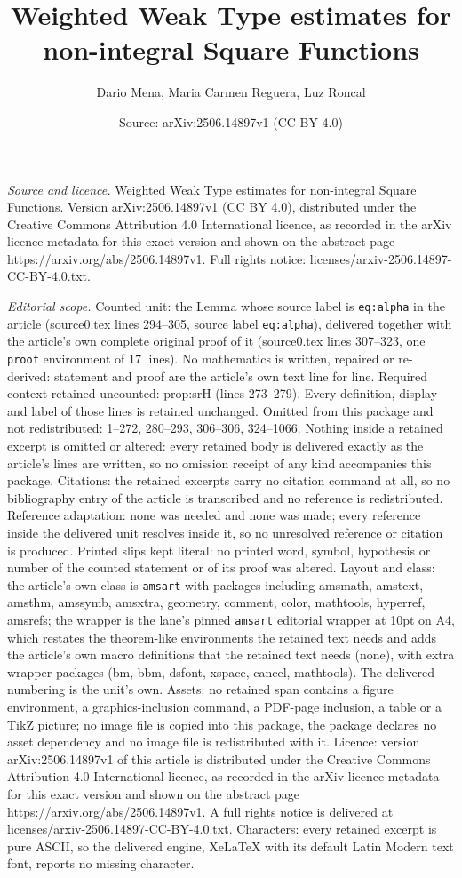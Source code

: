 \documentclass[10pt,a4paper]{amsart}
\title[Weighted Weak Type estimates for non-integral Square Functio]{Weighted Weak Type estimates for non-integral Square Functions}
\author{Dario Mena, Maria Carmen Reguera, Luz Roncal}
\date{Source: arXiv:2506.14897v1 (CC BY 4.0)}
\begin{document}
\maketitle

\noindent\emph{Source and licence.} Weighted Weak Type estimates for non-integral Square Functions. Version arXiv:2506.14897v1 (CC BY 4.0), distributed under the Creative Commons Attribution 4.0 International licence, as recorded in the arXiv licence metadata for this exact version and shown on the abstract page https://arxiv.org/abs/2506.14897v1. Full rights notice: licenses/arxiv-2506.14897-CC-BY-4.0.txt.\par\smallskip

\noindent\textit{Editorial scope.} Counted unit: the Lemma whose source label is \texttt{eq:alpha} in the article (source0.tex lines 294--305, source label \texttt{eq:alpha}), delivered together with the article's own complete original proof of it (source0.tex lines 307--323, one \texttt{proof} environment of 17 lines). No mathematics is written, repaired or re-derived: statement and proof are the article's own text line for line. Required context retained uncounted: prop:srH (lines 273--279). Every definition, display and label of those lines is retained unchanged. Omitted from this package and not redistributed: 1--272, 280--293, 306--306, 324--1066. Nothing inside a retained excerpt is omitted or altered: every retained body is delivered exactly as the article's lines are written, so no omission receipt of any kind accompanies this package. Citations: the retained excerpts carry no citation command at all, so no bibliography entry of the article is transcribed and no reference is redistributed. Reference adaptation: none was needed and none was made; every reference inside the delivered unit resolves inside it, so no unresolved reference or citation is produced. Printed slips kept literal: no printed word, symbol, hypothesis or number of the counted statement or of its proof was altered. Layout and class: the article's own class is \texttt{amsart} with packages including amsmath, amstext, amsthm, amssymb, amsxtra, geometry, comment, color, mathtools, hyperref, amsrefs; the wrapper is the lane's pinned \texttt{amsart} editorial wrapper at 10pt on A4, which restates the theorem-like environments the retained text needs and adds the article's own macro definitions that the retained text needs (none), with extra wrapper packages (bm, bbm, dsfont, xspace, cancel, mathtools). The delivered numbering is the unit's own. Assets: no retained span contains a figure environment, a graphics-inclusion command, a PDF-page inclusion, a table or a TikZ picture; no image file is copied into this package, the package declares no asset dependency and no image file is redistributed with it. Licence: version arXiv:2506.14897v1 of this article is distributed under the Creative Commons Attribution 4.0 International licence, as recorded in the arXiv licence metadata for this exact version and shown on the abstract page https://arxiv.org/abs/2506.14897v1. A full rights notice is delivered at licenses/arxiv-2506.14897-CC-BY-4.0.txt. Characters: every retained excerpt is pure ASCII, so the delivered engine, XeLaTeX with its default Latin Modern text font, reports no missing character.
\end{document}
